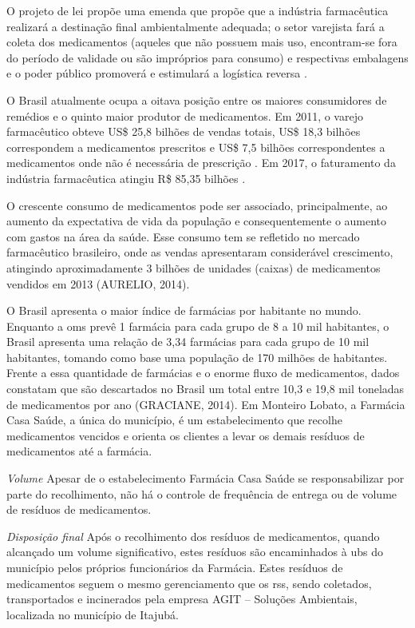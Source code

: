 \begin{description}
	O projeto de lei propõe uma emenda que propõe que a indústria farmacêutica realizará a destinação final ambientalmente adequada; o setor varejista fará a coleta dos medicamentos (aqueles que não possuem mais uso, encontram-se fora do período de validade ou são impróprios para consumo) e respectivas embalagens e o poder público promoverá e estimulará a logística reversa \cite{pl148}.

	O Brasil atualmente ocupa a oitava posição entre os maiores consumidores de remédios e o quinto maior produtor de medicamentos. Em 2011, o varejo farmacêutico obteve US\$ 25,8 bilhões de vendas totais, US\$ 18,3 bilhões correspondem a medicamentos prescritos e US\$ 7,5 bilhões correspondentes a medicamentos onde não é necessária de prescrição \cite{pwc2013}. Em 2017, o faturamento da indústria farmacêutica atingiu R\$ 85,35 bilhões \cite{INTERFARMA2017}.
	 
	O crescente consumo de medicamentos pode ser associado, principalmente, ao aumento da expectativa de vida da população e consequentemente o aumento com gastos na área da saúde. Esse consumo tem se refletido no mercado farmacêutico brasileiro, onde as vendas apresentaram considerável crescimento, atingindo aproximadamente 3 bilhões de unidades (caixas) de medicamentos vendidos em 2013 (AURELIO, 2014).
	
	O Brasil apresenta o maior índice de farmácias por habitante no mundo. Enquanto a \gls{oms} prevê 1 farmácia para cada grupo de 8 a 10 mil habitantes, o Brasil apresenta uma relação de 3,34 farmácias para cada grupo de 10 mil habitantes, tomando como base uma população de 170 milhões de habitantes. Frente a essa quantidade de farmácias e o enorme fluxo de medicamentos, dados constatam que são descartados no Brasil um total entre 10,3 e 19,8 mil toneladas de medicamentos por ano (GRACIANE, 2014).
	Em Monteiro Lobato, a Farmácia Casa Saúde, a única do município, é um estabelecimento que recolhe medicamentos vencidos e orienta os clientes a levar os demais resíduos de medicamentos até a farmácia.
	
	\subitem \textit{Volume}
	Apesar de o estabelecimento Farmácia Casa Saúde se responsabilizar por parte do recolhimento, não há o controle de frequência de entrega ou de volume de resíduos de medicamentos.
	
	\subitem \textit{Disposição final}
	Após o recolhimento dos resíduos de medicamentos, quando alcançado um volume significativo, estes resíduos são encaminhados à \gls{ubs} do município pelos próprios funcionários da Farmácia.
	Estes resíduos de medicamentos seguem o mesmo gerenciamento que os \gls{rss}, sendo coletados, transportados e incinerados pela empresa AGIT – Soluções Ambientais, localizada no município de Itajubá.
			
\end{description}

